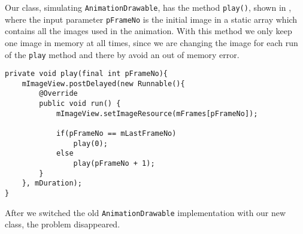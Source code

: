 Our class, simulating \lstinline{AnimationDrawable}, has the method \lstinline{play()}, shown in , where the input parameter \lstinline{pFrameNo} is the initial image in a static array which contains all the images used in the animation. 
With this method we only keep one image in memory at all times, since we are changing the image for each run of the \lstinline{play} method and there by avoid an out of memory error.
\begin{lstlisting}[caption={Our method for playing an animation based on a set of images.},label={lst:methodPlay}]
private void play(final int pFrameNo){
    mImageView.postDelayed(new Runnable(){
        @Override
        public void run() {                    
            mImageView.setImageResource(mFrames[pFrameNo]);

            if(pFrameNo == mLastFrameNo)
                play(0);
            else
                play(pFrameNo + 1);
        }
    }, mDuration);
}        
\end{lstlisting}

After we switched the old \lstinline{AnimationDrawable} implementation with our new class, the problem disappeared.